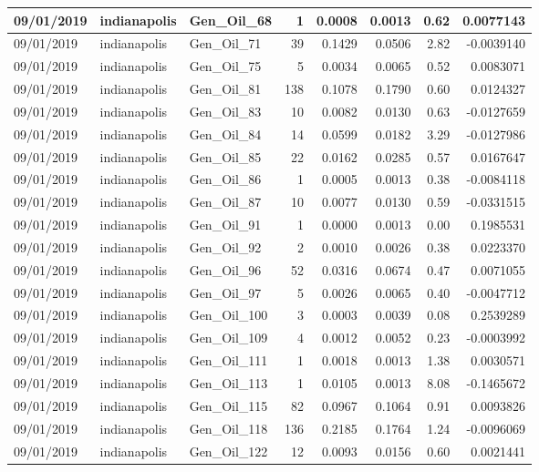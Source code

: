 \documentclass[
  letterpaper,
  DIV=11,
  numbers=noendperiod]{scrartcl}
\begin{document}
\begin{tabular}{l|l|l|r|r|r|r|r}
\hline
09/01/2019 & indianapolis & Gen\_Oil\_68 & 1 & 0.0008 & 0.0013 & 0.62 & 0.0077143\\
\hline
09/01/2019 & indianapolis & Gen\_Oil\_71 & 39 & 0.1429 & 0.0506 & 2.82 & -0.0039140\\
\hline
09/01/2019 & indianapolis & Gen\_Oil\_75 & 5 & 0.0034 & 0.0065 & 0.52 & 0.0083071\\
\hline
09/01/2019 & indianapolis & Gen\_Oil\_81 & 138 & 0.1078 & 0.1790 & 0.60 & 0.0124327\\
\hline
09/01/2019 & indianapolis & Gen\_Oil\_83 & 10 & 0.0082 & 0.0130 & 0.63 & -0.0127659\\
\hline
09/01/2019 & indianapolis & Gen\_Oil\_84 & 14 & 0.0599 & 0.0182 & 3.29 & -0.0127986\\
\hline
09/01/2019 & indianapolis & Gen\_Oil\_85 & 22 & 0.0162 & 0.0285 & 0.57 & 0.0167647\\
\hline
09/01/2019 & indianapolis & Gen\_Oil\_86 & 1 & 0.0005 & 0.0013 & 0.38 & -0.0084118\\
\hline
09/01/2019 & indianapolis & Gen\_Oil\_87 & 10 & 0.0077 & 0.0130 & 0.59 & -0.0331515\\
\hline
09/01/2019 & indianapolis & Gen\_Oil\_91 & 1 & 0.0000 & 0.0013 & 0.00 & 0.1985531\\
\hline
09/01/2019 & indianapolis & Gen\_Oil\_92 & 2 & 0.0010 & 0.0026 & 0.38 & 0.0223370\\
\hline
09/01/2019 & indianapolis & Gen\_Oil\_96 & 52 & 0.0316 & 0.0674 & 0.47 & 0.0071055\\
\hline
09/01/2019 & indianapolis & Gen\_Oil\_97 & 5 & 0.0026 & 0.0065 & 0.40 & -0.0047712\\
\hline
09/01/2019 & indianapolis & Gen\_Oil\_100 & 3 & 0.0003 & 0.0039 & 0.08 & 0.2539289\\
\hline
09/01/2019 & indianapolis & Gen\_Oil\_109 & 4 & 0.0012 & 0.0052 & 0.23 & -0.0003992\\
\hline
09/01/2019 & indianapolis & Gen\_Oil\_111 & 1 & 0.0018 & 0.0013 & 1.38 & 0.0030571\\
\hline
09/01/2019 & indianapolis & Gen\_Oil\_113 & 1 & 0.0105 & 0.0013 & 8.08 & -0.1465672\\
\hline
09/01/2019 & indianapolis & Gen\_Oil\_115 & 82 & 0.0967 & 0.1064 & 0.91 & 0.0093826\\
\hline
09/01/2019 & indianapolis & Gen\_Oil\_118 & 136 & 0.2185 & 0.1764 & 1.24 & -0.0096069\\
\hline
09/01/2019 & indianapolis & Gen\_Oil\_122 & 12 & 0.0093 & 0.0156 & 0.60 & 0.0021441\\

\end{tabular}
\end{document}

